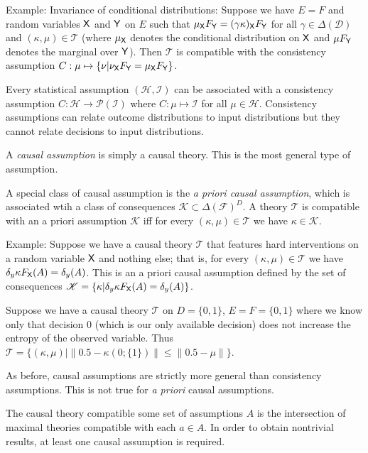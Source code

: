 Example: Invariance of conditional distributions: Suppose we have $E=F$ and random variables $\mathsf{X}$ and $\mathsf{Y}$ on $E$ such that $\mu_{\mathsf{X}} F_{\mathsf{Y}} = (\gamma \kappa)_{\mathsf{X}} F_{\mathsf{Y}}$ for all $\gamma\in \Delta(\mathcal{D})$ and $(\kappa,\mu)\in \mathscr{T}$ (where $\mu_{\mathsf{X}}$ denotes the conditional distribution on $\mathsf{X}$ and $\mu F_{\mathsf{Y}}$ denotes the marginal over $\mathsf{Y}$). Then $\mathscr{T}$ is compatible with the consistency assumption $C:\mu\mapsto \{\nu|\nu_{\mathsf{X}} F_{\mathsf{Y}} = \mu_{\mathsf{X}} F_{\mathsf{Y}}\}$.

Every statistical assumption $(\mathscr{H},\mathscr{I})$ can be associated with a consistency assumption $C:\mathscr{H}\to \mathscr{P}(\mathscr{I})$ where $C:\mu\mapsto \mathscr{I}$ for all $\mu\in \mathscr{H}$. Consistency assumptions can relate outcome distributions to input distributions but they cannot relate decisions to input distributions.

\begin{definition}
A \emph{causal assumption} is simply a causal theory. This is the most general type of assumption.

A special class of causal assumption is the \emph{a priori causal assumption}, which is associated wtih a class of consequences $\mathscr{K}\subset \Delta(\mathcal{F})^D$. A theory $\mathscr{T}$ is compatible with an a priori assumption $\mathscr{K}$ iff for every $(\kappa,\mu)\in \mathscr{T}$ we have $\kappa \in \mathscr{K}$.
\end{definition}

Example: Suppose we have a causal theory $\mathscr{T}$ that features hard interventions on a random variable $\mathsf{X}$ and nothing else; that is, for every $(\kappa,\mu)\in\mathscr{T}$ we have $\delta_y \kappa F_{\mathsf{X}}(A) = \delta_y(A)$. This is an a priori causal assumption defined by the set of consequences $\mathscr{K} = \{\kappa|\delta_y \kappa F_{\mathsf{X}}(A) = \delta_y(A)\} $.

Suppose we have a causal theory $\mathscr{T}$ on $D=\{0,1\}$, $E=F=\{0,1\}$ where we know only that decision $0$ (which is our only available decision) does not increase the entropy of the observed variable. Thus $\mathscr{T}=\{(\kappa,\mu)| \|0.5-\kappa (0;\{1\})\|\leq\|0.5-\mu\|\}$.

As before, causal assumptions are strictly more general than consistency assumptions. This is not true for \emph{a priori} causal assumptions.

The causal theory compatible some set of assumptions $A$ is the intersection of maximal theories compatible with each $a\in A$. In order to obtain nontrivial results, at least one causal assumption is required.

